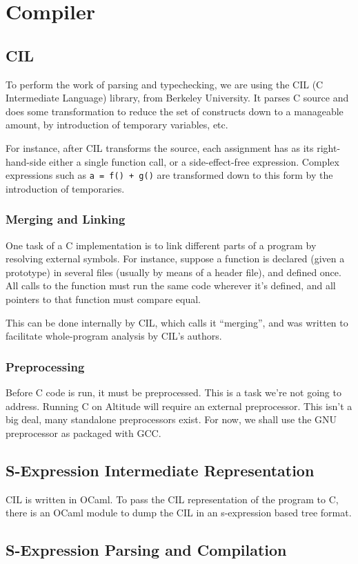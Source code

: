 \chapter{Compiler}
\section{CIL}
To perform the work of parsing and typechecking, we are using the CIL (C Intermediate Language) library, from Berkeley University. It parses C source and does some transformation to reduce the set of constructs down to a manageable amount, by introduction of temporary variables, etc.

For instance, after CIL transforms the source, each assignment has as its right-hand-side either a single function call, or a side-effect-free expression. Complex expressions such as {\tt a = f() + g()} are transformed down to this form by the introduction of temporaries.

\subsection{Merging and Linking}

One task of a C implementation is to link different parts of a program by resolving external symbols. For instance, suppose a function is declared (given a prototype) in several files (usually by means of a header file), and defined once. All calls to the function must run the same code wherever it's defined, and all pointers to that function must compare equal.

This can be done internally by CIL, which calls it ``merging'', and was written to facilitate whole-program analysis by CIL's authors.

\subsection{Preprocessing}
Before C code is run, it must be preprocessed. This is a task we're not going to address. Running C on Altitude will require an external preprocessor. This isn't a big deal, many standalone preprocessors exist. For now, we shall use the GNU preprocessor as packaged with GCC.

\section{S-Expression Intermediate Representation}

CIL is written in OCaml. To pass the CIL representation of the program to C, there is an OCaml module to dump the CIL in an s-expression based tree format.

\section{S-Expression Parsing and Compilation}
